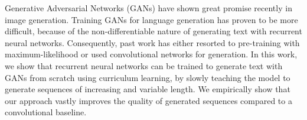 Generative Adversarial Networks (GANs) have shown great promise recently in image generation. Training GANs for language generation has proven to be more difficult, because of the non-differentiable nature of generating text with recurrent neural networks. Consequently, past work has either resorted to pre-training with maximum-likelihood or used convolutional networks for generation. In this work, we show that recurrent neural networks can be trained to generate text with GANs from scratch using curriculum learning, by slowly teaching the model to generate sequences of increasing and variable length. We empirically show that our approach vastly improves the quality of generated sequences compared to a convolutional baseline.
